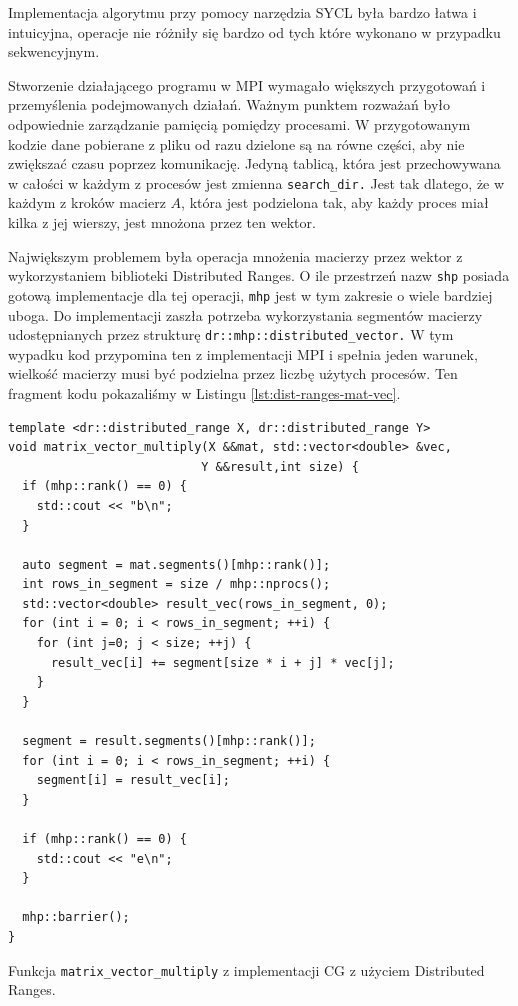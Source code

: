 \documentclass[a4paper,12pt]{book} %
\begin{document}
Implementacja algorytmu przy pomocy narzędzia SYCL była bardzo łatwa i intuicyjna, operacje nie różniły się bardzo od tych które wykonano w przypadku sekwencyjnym. 

Stworzenie działającego programu w MPI wymagało większych przygotowań i przemyślenia podejmowanych działań. Ważnym punktem rozważań było odpowiednie zarządzanie pamięcią pomiędzy procesami. W przygotowanym kodzie dane pobierane z pliku od razu dzielone są na równe części, aby nie zwiększać czasu poprzez komunikację. Jedyną tablicą, która jest przechowywana w całości w każdym z procesów jest zmienna \texttt{search\_dir.} Jest tak dlatego, że w każdym z kroków macierz $A$, która jest podzielona tak, aby każdy proces miał kilka z jej wierszy, jest mnożona przez ten wektor.

Największym problemem była operacja mnożenia macierzy przez wektor z wykorzystaniem biblioteki Distributed Ranges. O ile przestrzeń nazw \texttt{shp} posiada gotową implementacje dla tej operacji, \texttt{mhp} jest w tym zakresie o wiele bardziej uboga. Do implementacji zaszła potrzeba wykorzystania segmentów macierzy udostępnianych przez strukturę \texttt{dr::mhp::distributed\_vector.} W tym wypadku kod przypomina ten z implementacji MPI i spełnia jeden warunek, wielkość macierzy musi być podzielna przez liczbę użytych procesów. Ten fragment kodu pokazaliśmy w Listingu \ref{lst:dist-ranges-mat-vec}.

\begin{lstfloat}
\lstset{language=C++}
\begin{lstlisting}[frame=single]
template <dr::distributed_range X, dr::distributed_range Y>
void matrix_vector_multiply(X &&mat, std::vector<double> &vec, 
						   Y &&result,int size) {
  if (mhp::rank() == 0) {
    std::cout << "b\n";
  }

  auto segment = mat.segments()[mhp::rank()];
  int rows_in_segment = size / mhp::nprocs();
  std::vector<double> result_vec(rows_in_segment, 0);
  for (int i = 0; i < rows_in_segment; ++i) {
    for (int j=0; j < size; ++j) {
      result_vec[i] += segment[size * i + j] * vec[j];
    }
  }

  segment = result.segments()[mhp::rank()];
  for (int i = 0; i < rows_in_segment; ++i) {
    segment[i] = result_vec[i];
  }

  if (mhp::rank() == 0) {
    std::cout << "e\n";
  }

  mhp::barrier();
}

\end{lstlisting}
\caption{Funkcja \texttt{matrix\_vector\_multiply} z implementacji CG z użyciem Distributed Ranges.}
\label{lst:dist-ranges-mat-vec}
\end{lstfloat}
\end{document}
